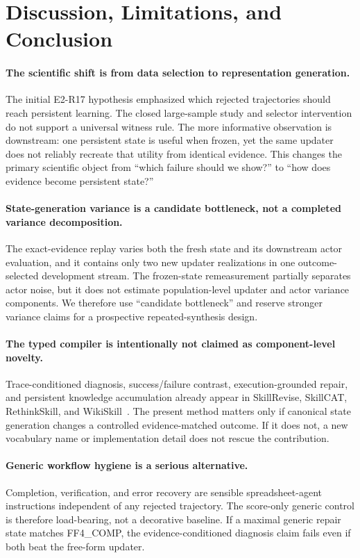 \section{Discussion, Limitations, and Conclusion}
\label{sec:discussion}

\paragraph{The scientific shift is from data selection to representation generation.}
The initial E2-R17 hypothesis emphasized which rejected trajectories should reach persistent learning. The closed large-sample study and selector intervention do not support a universal witness rule. The more informative observation is downstream: one persistent state is useful when frozen, yet the same updater does not reliably recreate that utility from identical evidence. This changes the primary scientific object from ``which failure should we show?'' to ``how does evidence become persistent state?''

\paragraph{State-generation variance is a candidate bottleneck, not a completed variance decomposition.}
The exact-evidence replay varies both the fresh state and its downstream actor evaluation, and it contains only two new updater realizations in one outcome-selected development stream. The frozen-state remeasurement partially separates actor noise, but it does not estimate population-level updater and actor variance components. We therefore use ``candidate bottleneck'' and reserve stronger variance claims for a prospective repeated-synthesis design.

\paragraph{The typed compiler is intentionally not claimed as component-level novelty.}
Trace-conditioned diagnosis, success/failure contrast, execution-grounded repair, and persistent knowledge accumulation already appear in SkillRevise, SkillCAT, RethinkSkill, and WikiSkill~\citep{liu2026skillrevise,chen2026skillcat,liu2026rethinkskill,tang2026wikiskill}. The present method matters only if canonical state generation changes a controlled evidence-matched outcome. If it does not, a new vocabulary name or implementation detail does not rescue the contribution.

\paragraph{Generic workflow hygiene is a serious alternative.}
Completion, verification, and error recovery are sensible spreadsheet-agent instructions independent of any rejected trajectory. The score-only generic control is therefore load-bearing, not a decorative baseline. If a maximal generic repair state matches FF4\_COMP, the evidence-conditioned diagnosis claim fails even if both beat the free-form updater.

